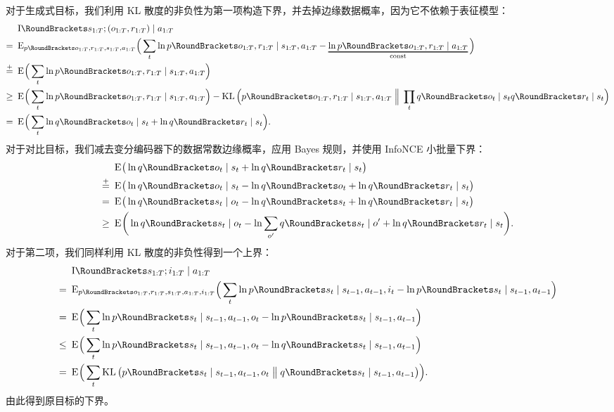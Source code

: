 对于生成式目标，我们利用 KL 散度的非负性为第一项构造下界，并去掉边缘数据概率，因为它不依赖于表征模型：
\begin{equation}
\begin{aligned}
&\MI{s_{1:T};(o_{1:T},r_{1:T}) \mid a_{1:T}} \\
=\enskip&\E[\Big]{\p(o_{1:T},r_{1:T},s_{1:T},a_{1:T})}{\sum_t
 \ln\p(o_{1:T},r_{1:T}|s_{1:T},a_{1:T})
 -\describe{\ln\p(o_{1:T},r_{1:T}|a_{1:T})}{const}} \\
\stackrel{+}{=}\enskip&\E[\Big]{}{\sum_t
 \ln\p(o_{1:T},r_{1:T}|s_{1:T},a_{1:T})} \\
\geq\enskip&\E[\Big]{}{\sum_t
 \ln\p(o_{1:T},r_{1:T}|s_{1:T},a_{1:T})}
 -\KL[\Big]{\p(o_{1:T},r_{1:T}|s_{1:T},a_{1:T})}{\prod_t\q(o_t|s_t)\q(r_t|s_t)} \\
=\enskip&\E[\Big]{}{\sum_t
 \ln\q(o_t|s_t)+\ln\q(r_t|s_t)}.
\end{aligned}
\end{equation}%
对于对比目标，我们减去变分编码器下的数据常数边缘概率，应用 Bayes 规则，并使用 InfoNCE 小批量下界\citep{poole2019bounds}：
\begin{equation}
\begin{aligned}
&\E{}{\ln\q(o_t|s_t)+\ln\q(r_t|s_t)} \\
\upto\enskip&\E{}{\ln\q(o_t|s_t)-\ln\q(o_t)+\ln\q(r_t|s_t)} \\
=\enskip&\E{}{\ln\q(s_t|o_t)-\ln\q(s_t)+\ln\q(r_t|s_t)} \\
\geq\enskip&\E[\bigg]{}{\ln\q(s_t|o_t)-\ln\sum_{o'}\q(s_t|o')+\ln\q(r_t|s_t)}.
\end{aligned}
\end{equation}%
对于第二项，我们同样利用 KL 散度的非负性得到一个上界：
\begin{equation}
\begin{aligned}
&\MI{s_{1:T};i_{1:T} \mid a_{1:T}} \\
=\enskip&\E[\Big]{\p(o_{1:T},r_{1:T},s_{1:T},a_{1:T},i_{1:T})}{\sum_t
 \ln\p(s_t|s_{t-1},a_{t-1},i_t)
 -\ln\p(s_t|s_{t-1},a_{t-1})} \\
=\enskip&\E[\Big]{}{\sum_t
 \ln\p(s_t|s_{t-1},a_{t-1},o_t)
 -\ln\p(s_t|s_{t-1},a_{t-1})} \\
\leq\enskip&\E[\Big]{}{\sum_t
 \ln\p(s_t|s_{t-1},a_{t-1},o_t)
 -\ln\q(s_t|s_{t-1},a_{t-1})} \\
=\enskip&\E[\Big]{}{\sum_t
 \KL{\p(s_t|s_{t-1},a_{t-1},o_t)}{\q(s_t|s_{t-1},a_{t-1})}}.
\end{aligned}
\end{equation}%
由此得到原目标的下界。

